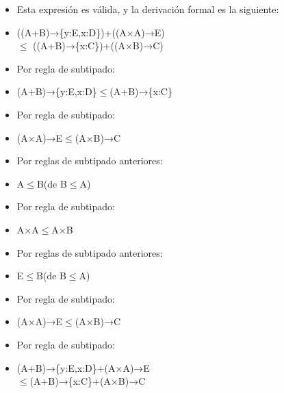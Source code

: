\documentclass{article}
\begin{document}
\begin{itemize}
\begin{itemize}
            \begin{center}
                \begin{itemize}
                    \item Esta expresión es válida, y la derivación formal es la siguiente:
                    \item[ ] ((A+B)→\{y:E,x:D\})+((A×A)→E)\\ $\leq$ ((A+B)→\{x:C\})+((A×B)→C)
                    \item Por regla de subtipado:
                    \item[ ] (A+B)→\{y:E,x:D\}$\leq$(A+B)→\{x:C\}
                    \item Por regla de subtipado:
                    \item[ ] (A×A)→E$\leq$(A×B)→C
                    \item Por reglas de subtipado anteriores:
                    \item[ ] A$\leq$B(de B$\leq$A)
                    \item Por regla de subtipado:
                    \item[ ] A×A$\leq$A×B
                    \item Por reglas de subtipado anteriores:
                    \item[ ] E$\leq$B(de B$\leq$A)
                    \item Por regla de subtipado:
                    \item[ ] (A×A)→E$\leq$(A×B)→C
                    \item Por regla de subtipado:
                    \item[ ] (A+B)→\{y:E,x:D\}+(A×A)→E\\ $\leq$(A+B)→\{x:C\}+(A×B)→C
                \end{itemize}
            \end{center}
 



\end{itemize}
\end{itemize}
\end{document}
